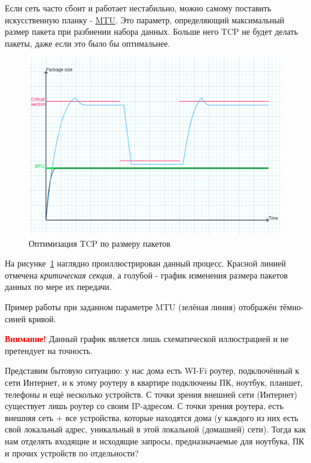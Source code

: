 Если сеть часто сбоит и работает нестабильно, можно самому поставить искусственную планку - \href{https://ru.wikipedia.org/wiki/Maximum_transmission_unit}{MTU}. Это параметр, определяющий максимальный размер пакета при разбиении набора данных. Больше него TCP не будет делать пакеты, даже если это было бы оптимальнее.

\begin{figure}[h]
	\centering
	\includegraphics[scale=0.5]{9/09_01.png}
	\caption{Оптимизация TCP по размеру пакетов}
	\label{fig:graph_9}
\end{figure}

На рисунке~\ref{fig:graph_9} наглядно проиллюстрирован данный процесс. Красной линией отмечена \textit{критическая секция}, а голубой - график изменения размера пакетов данных по мере их передачи.

Пример работы при заданном параметре MTU (зелёная линия) отображён тёмно-синей кривой.

\textcolor{red}{\textbf{Внимание!}} Данный график является лишь схематической иллюстрацией и не претендует на точность.

\bigskip 
Представим бытовую ситуацию: у нас дома есть WI-Fi роутер, подключённый к сети Интернет, и к этому роутеру в квартире подключены ПК, ноутбук, планшет, телефоны и ещё несколько устройств. С точки зрения внешней сети (Интернет) существует лишь роутер со своим IP-адресом. С точки зрения роутера, есть внешняя сеть + все устройства, которые находятся дома (у каждого из них есть свой локальный адрес, уникальный в этой локальной (домашней) сети). Тогда как нам отделять входящие и исходящие запросы, предназначаемые для ноутбука, ПК и прочих устройств по отдельности?

